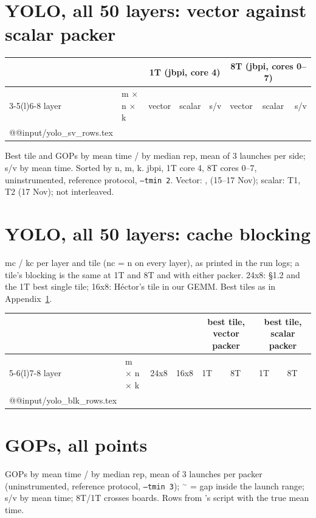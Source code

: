 \section{YOLO, all 50 layers: vector against scalar packer}\label{app:yolo}
{\footnotesize\setlength\tabcolsep{3pt}
\begin{longtable}{@{}l l ll r ll r@{}}
\toprule
 & & \multicolumn{3}{c}{1T (jbpi, core 4)} & \multicolumn{3}{c}{8T (jbpi, cores 0--7)} \\
\cmidrule(lr){3-5}\cmidrule(l){6-8}
layer & m $\times$ n $\times$ k & vector & scalar & s/v & vector & scalar & s/v \\
\midrule\endhead
\csname @@input\endcsname \D/yolo_sv_rows.tex
\bottomrule
\end{longtable}}
\noindent Best tile and GOPs by mean time / by median rep, mean of 3 launches per side; s/v by mean time. Sorted by n, m, k. jbpi, 1T core 4, 8T cores 0--7, uninstrumented, reference protocol, \texttt{--tmin 2}. Vector: ,  (15--17 Nov); scalar:  T1, T2 (17 Nov); not interleaved.

\section{YOLO, all 50 layers: cache blocking}\label{app:blk}
mc / kc per layer and tile (nc = n on every layer), as printed in the run logs; a tile's blocking is the same at 1T and 8T and with either packer. 24x8: \S1.2 and the 1T best single tile; 16x8: H\'ector's tile in our GEMM. Best tiles as in Appendix~\ref{app:yolo}.
{\footnotesize\setlength\tabcolsep{4pt}
\begin{longtable}{@{}l l rr ll ll@{}}
\toprule
 & & & & \multicolumn{2}{c}{best tile, vector packer} & \multicolumn{2}{c}{best tile, scalar packer} \\
\cmidrule(lr){5-6}\cmidrule(l){7-8}
layer & m $\times$ n $\times$ k & 24x8 & 16x8 & 1T & 8T & 1T & 8T \\
\midrule\endhead
\csname @@input\endcsname \D/yolo_blk_rows.tex
\bottomrule
\end{longtable}}

\section{ GOPs, all points}\label{app:85}
GOPs by mean time / by median rep, mean of 3 launches per packer (uninstrumented, reference protocol, \texttt{--tmin 3}); $^{\sim}$ = gap inside the launch range; s/v by mean time; 8T/1T crosses boards. Rows from 's script with the true mean time.
